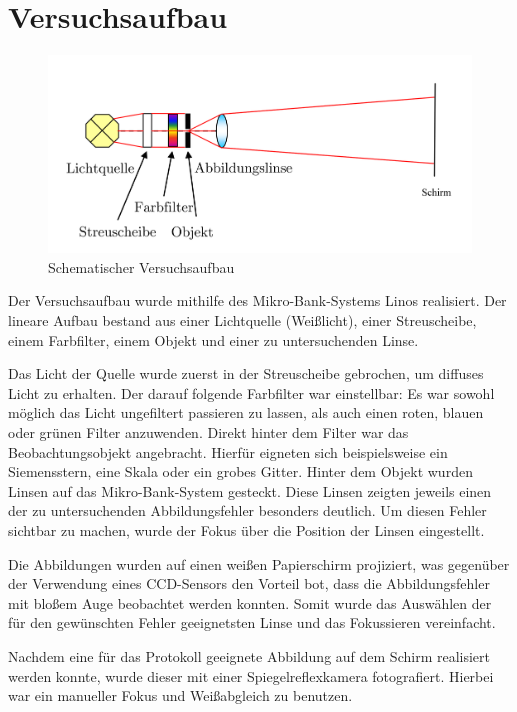 \section{Versuchsaufbau}

\begin{figure}[h!]
	\includegraphics[width=\linewidth]{img/versuchsaufbau.png}
	\caption{Schematischer Versuchsaufbau}
	\label{fig:versuchsaufbau}
\end{figure}

Der Versuchsaufbau wurde mithilfe des Mikro-Bank-Systems Linos realisiert. Der lineare Aufbau bestand aus einer Lichtquelle (Weißlicht), einer Streuscheibe, einem Farbfilter, einem Objekt und einer zu untersuchenden Linse. 

Das Licht der Quelle wurde zuerst in der Streuscheibe gebrochen, um diffuses Licht zu erhalten. Der darauf folgende Farbfilter war einstellbar: Es war sowohl möglich das Licht ungefiltert passieren zu lassen, als auch einen roten, blauen oder grünen Filter anzuwenden. Direkt hinter dem Filter war das Beobachtungsobjekt angebracht. Hierfür eigneten sich beispielsweise ein Siemensstern, eine Skala oder ein grobes Gitter. Hinter dem Objekt wurden Linsen auf das Mikro-Bank-System gesteckt. Diese Linsen zeigten jeweils einen der zu untersuchenden Abbildungsfehler besonders deutlich. Um diesen Fehler sichtbar zu machen, wurde der Fokus über die Position der Linsen eingestellt. 

Die Abbildungen wurden auf einen weißen Papierschirm projiziert, was gegenüber der Verwendung eines CCD-Sensors den Vorteil bot, dass die Abbildungsfehler mit bloßem Auge beobachtet werden konnten. Somit wurde das Auswählen der für den gewünschten Fehler geeignetsten Linse und das Fokussieren vereinfacht.

Nachdem eine für das Protokoll geeignete Abbildung auf dem Schirm realisiert werden konnte, wurde dieser mit einer Spiegelreflexkamera fotografiert. Hierbei war ein manueller Fokus und Weißabgleich zu benutzen.

